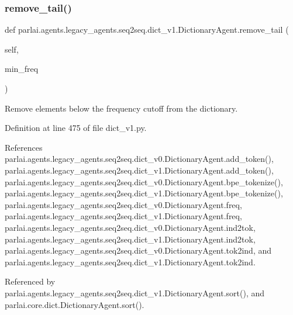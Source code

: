 \subsubsection{\texorpdfstring{remove\+\_\+tail()}{remove\_tail()}}
{\footnotesize\ttfamily def parlai.\+agents.\+legacy\+\_\+agents.\+seq2seq.\+dict\+\_\+v1.\+Dictionary\+Agent.\+remove\+\_\+tail (\begin{DoxyParamCaption}\item[{}]{self,  }\item[{}]{min\+\_\+freq }\end{DoxyParamCaption})}

\begin{DoxyVerb}Remove elements below the frequency cutoff from the dictionary.\end{DoxyVerb}
 

Definition at line 475 of file dict\+\_\+v1.\+py.



References parlai.\+agents.\+legacy\+\_\+agents.\+seq2seq.\+dict\+\_\+v0.\+Dictionary\+Agent.\+add\+\_\+token(), parlai.\+agents.\+legacy\+\_\+agents.\+seq2seq.\+dict\+\_\+v1.\+Dictionary\+Agent.\+add\+\_\+token(), parlai.\+agents.\+legacy\+\_\+agents.\+seq2seq.\+dict\+\_\+v0.\+Dictionary\+Agent.\+bpe\+\_\+tokenize(), parlai.\+agents.\+legacy\+\_\+agents.\+seq2seq.\+dict\+\_\+v1.\+Dictionary\+Agent.\+bpe\+\_\+tokenize(), parlai.\+agents.\+legacy\+\_\+agents.\+seq2seq.\+dict\+\_\+v0.\+Dictionary\+Agent.\+freq, parlai.\+agents.\+legacy\+\_\+agents.\+seq2seq.\+dict\+\_\+v1.\+Dictionary\+Agent.\+freq, parlai.\+agents.\+legacy\+\_\+agents.\+seq2seq.\+dict\+\_\+v0.\+Dictionary\+Agent.\+ind2tok, parlai.\+agents.\+legacy\+\_\+agents.\+seq2seq.\+dict\+\_\+v1.\+Dictionary\+Agent.\+ind2tok, parlai.\+agents.\+legacy\+\_\+agents.\+seq2seq.\+dict\+\_\+v0.\+Dictionary\+Agent.\+tok2ind, and parlai.\+agents.\+legacy\+\_\+agents.\+seq2seq.\+dict\+\_\+v1.\+Dictionary\+Agent.\+tok2ind.



Referenced by parlai.\+agents.\+legacy\+\_\+agents.\+seq2seq.\+dict\+\_\+v1.\+Dictionary\+Agent.\+sort(), and parlai.\+core.\+dict.\+Dictionary\+Agent.\+sort().

